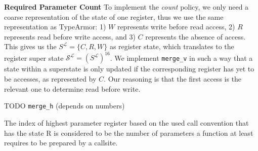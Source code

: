 \textbf{Required Parameter Count} To implement the \emph{count} policy, we only need a coarse representation of the state of one register, thus we use the same representation 
as TypeArmor: 1) $W$ represents write before read access, 2) $R$ represents read before write access, and 3) $C$ represents the absence of access.
This gives us the $S^\mathcal{L} = \{ C, R, W \}$ as register state, which translates to the register super state $\mathcal{S}^\mathcal{L} = (S^\mathcal{L})^{16}$.
We implement \texttt{merge\_v} in such a way that a state within a superstate is only updated if the corresponding register has yet to be accesses, as represented by $C$. 
Our reasoning is that the first access is the relevant one to determine read before write.

TODO  \texttt{merge\_h} (depends on numbers)

The index of highest parameter register based on the used call convention that has the state R is considered to be the number of parameters a function at least requires 
to be prepared by a callsite.

%
%
%
%

